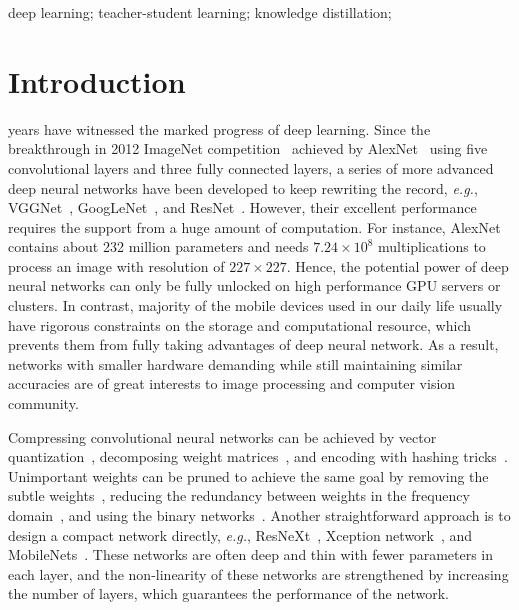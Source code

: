 \documentclass[journal]{IEEEtran}
\begin{document}
\begin{IEEEkeywords}
deep learning; teacher-student learning; knowledge distillation;
\end{IEEEkeywords}

\IEEEpeerreviewmaketitle



\section{Introduction}

 years have witnessed the marked progress of deep learning. Since the breakthrough in 2012 ImageNet competition~\cite{russakovsky2015imagenet} achieved by AlexNet~\cite{krizhevsky2012imagenet} using five convolutional layers and three fully connected layers, a series of more advanced deep neural networks have been developed to keep rewriting the record, \emph{e.g.}, VGGNet~\cite{simonyan2014very}, GoogLeNet~\cite{szegedy2016rethinking}, and ResNet~\cite{he2016deep}. However, their excellent performance requires the support from a huge amount of computation.  For instance, AlexNet~\cite{simonyan2014very} contains about 232 million parameters and needs $7.24 \times 10^8$ multiplications to process an image with resolution of $227 \times 227$. Hence, the potential power of deep neural networks can only be fully unlocked on high performance GPU servers or clusters. In contrast, majority of the mobile devices used in our daily life usually have rigorous constraints on the storage and computational resource, which prevents them from fully taking advantages of deep neural network. As a result, networks with smaller hardware demanding while still maintaining similar accuracies are of great interests to image processing and computer vision community.
  
Compressing convolutional neural networks can be achieved by vector quantization~\cite{gong2014compressing}, decomposing weight matrices~\cite{denton2014exploiting}, and encoding with hashing tricks~\cite{chen2015compressing}.  Unimportant weights can be pruned to achieve the same goal by removing the subtle weights~\cite{han2015learning,han2015deep}, reducing the redundancy between weights in the frequency domain~\cite{wang2016cnnpack}, and using the binary networks~\cite{courbariaux2016binarized,rastegari2016xnor}. Another straightforward approach is to design a compact network directly, \emph{e.g.}, ResNeXt~\cite{xie2017aggregated}, Xception network~\cite{chollet2017xception}, and MobileNets~\cite{howard2017mobilenets}. These networks are often deep and thin with fewer parameters in each layer, and the non-linearity of these networks are strengthened by increasing the number of layers, which guarantees the performance of the network.
\end{document}
